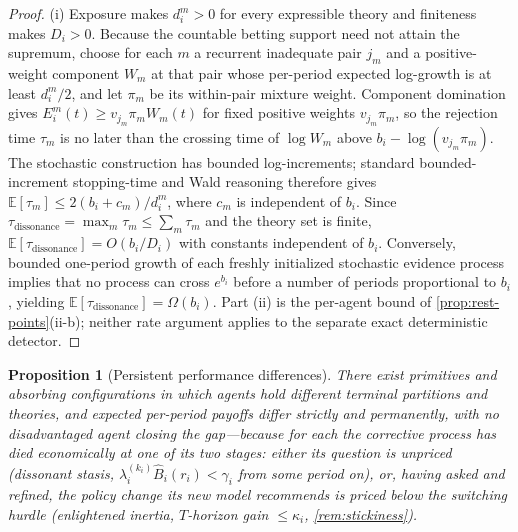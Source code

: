 \documentclass[11pt]{article}
\newtheorem{proposition}[assumption]{Proposition}
\theoremstyle{definition}
\begin{document}
\begin{proof}
(i) Exposure makes $d_i^m>0$ for every expressible theory and finiteness makes $D_i>0$.
Because the countable betting support need not attain the supremum, choose for each $m$ a recurrent inadequate pair $j_m$ and a positive-weight component $W_m$ at that pair whose per-period expected log-growth is at least $d_i^m/2$, and let $\pi_m$ be its within-pair mixture weight.
Component domination gives $E_i^m(t)\ge v_{j_m}\pi_m W_m(t)$ for fixed positive weights $v_{j_m}\pi_m$, so the rejection time $\tau_m$ is no later than the crossing time of $\log W_m$ above $b_i-\log(v_{j_m}\pi_m)$.
The stochastic construction has bounded log-increments; standard bounded-increment stopping-time and Wald reasoning therefore gives $\mathbb E[\tau_m]\le 2(b_i+c_m)/d_i^m$, where $c_m$ is independent of $b_i$.
Since $\tau_{\mathrm{dissonance}}=\max_m\tau_m\le\sum_m\tau_m$ and the theory set is finite, $\mathbb E[\tau_{\mathrm{dissonance}}]=O(b_i/D_i)$ with constants independent of $b_i$.
Conversely, bounded one-period growth of each freshly initialized stochastic evidence process implies that no process can cross $e^{b_i}$ before a number of periods proportional to $b_i$, yielding $\mathbb E[\tau_{\mathrm{dissonance}}]=\Omega(b_i)$.
Part (ii) is the per-agent bound of \cref{prop:rest-points}(ii-b); neither rate argument applies to the separate exact deterministic detector.
\end{proof}

\begin{proposition}[Persistent performance differences]
\label{prop:persistence}
There exist primitives and absorbing configurations in which agents hold different terminal partitions and theories, and expected per-period payoffs differ strictly and permanently, with no disadvantaged agent closing the gap---because for each the corrective process has died economically at one of its two stages: either its question is unpriced (\emph{dissonant stasis}, $\lambda_i^{(k_i)}\widehat B_i(r_i)<\gamma_i$ from some period on), or, having asked and refined, the policy change its new model recommends is priced below the switching hurdle (\emph{enlightened inertia}, $T$-horizon gain $\le\kappa_i$, \cref{rem:stickiness}).
\end{proposition}
\end{document}
